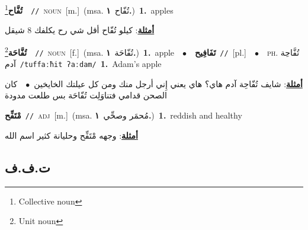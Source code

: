 \documentclass[10pt,a4paper,twoside]{article} %
\begin{document}
\begin{multicols}{2}
{{{{{{{{{{{{\setlength\topsep{0pt}\textbf{\foreignlanguage{arabic}{تُفَّاح}}\footnote{Collective noun}\ \ {\color{gray}\texttt{//}\color{black}}\ \textsc{noun}\ [m.]\ \color{gray}(msa. \foreignlanguage{arabic}{تُفّاح}~\foreignlanguage{arabic}{\textbf{١.}})\color{black}\ \textbf{1.}~apples\  \begin{flushright}\color{gray}\foreignlanguage{arabic}{\textbf{\underline{\foreignlanguage{arabic}{أمثلة}}}: كيلو تُفّاح أقل شي رح يكلفك 8 شيقل}\end{flushright}\color{black}} \vspace{2mm}

{\setlength\topsep{0pt}\textbf{\foreignlanguage{arabic}{تُفَّاحَة}}\footnote{Unit noun}\ \ {\color{gray}\texttt{//}\color{black}}\ \textsc{noun}\ [f.]\ \color{gray}(msa. \foreignlanguage{arabic}{تُفّاحَة}~\foreignlanguage{arabic}{\textbf{١.}})\color{black}\ \textbf{1.}~apple\ \ $\bullet$\ \ \setlength\topsep{0pt}\textbf{\foreignlanguage{arabic}{تَفَافِيح}}\ {\color{gray}\texttt{//}\color{black}}\ [pl.]\ \ $\bullet$\ \ \textsc{ph.} \color{gray} \foreignlanguage{arabic}{تُفَّاحِة آدم}\color{black}\ {\color{gray}\texttt{/{\sffamily tuffaːħit ʔaːdam}/}\color{black}}\ \textbf{1.}~Adam's apple\  \begin{flushright}\color{gray}\foreignlanguage{arabic}{\textbf{\underline{\foreignlanguage{arabic}{أمثلة}}}: شايف تُفّاحِة آدم هاي؟ هاي يعني إِني أرجل منك ومن كل عيلتك الخايخين\ $\bullet$\ \  كان الصحن قدامي فتناوَلِت تُفّاحَة بس طلعت مدودة}\end{flushright}\color{black}} \vspace{2mm}

{\setlength\topsep{0pt}\textbf{\foreignlanguage{arabic}{مْتَفِّح}}\ {\color{gray}\texttt{//}\color{black}}\ \textsc{adj}\ [m.]\ \color{gray}(msa. \foreignlanguage{arabic}{مُحمَر وصحِّي}~\foreignlanguage{arabic}{\textbf{١.}})\color{black}\ \textbf{1.}~reddish and healthy\  \begin{flushright}\color{gray}\foreignlanguage{arabic}{\textbf{\underline{\foreignlanguage{arabic}{أمثلة}}}: وجهه مْتَفِّح وحليانة كثير اسم الله}\end{flushright}\color{black}} \vspace{2mm}

\vspace{-3mm}
\subsection*{\color{blue}\foreignlanguage{arabic}{ت.ف.ف}\color{blue}{}} 

}}}}}}}}}}}
\end{multicols}
\end{document}
